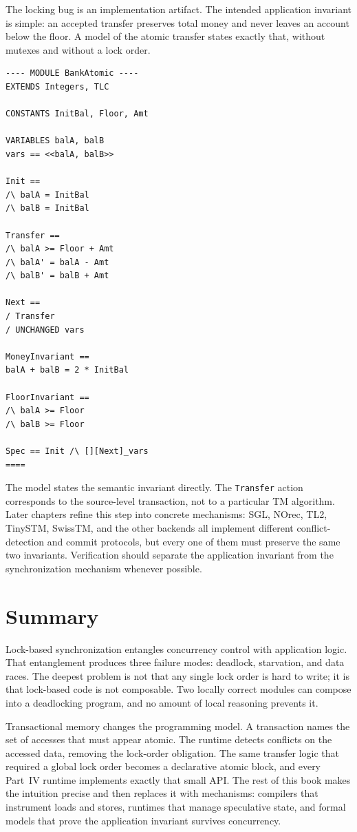 The locking bug is an implementation artifact. The intended application
invariant is simple: an accepted transfer preserves total money and never
leaves an account below the floor. A model of the atomic transfer states
exactly that, without mutexes and without a lock order.

\begin{lstlisting}[caption={A TLA+ model of atomic bank transfers and their invariants.}, label={lst:bank-atomic}]
---- MODULE BankAtomic ----
EXTENDS Integers, TLC

CONSTANTS InitBal, Floor, Amt

VARIABLES balA, balB
vars == <<balA, balB>>

Init ==
/\ balA = InitBal
/\ balB = InitBal

Transfer ==
/\ balA >= Floor + Amt
/\ balA' = balA - Amt
/\ balB' = balB + Amt

Next ==
/ Transfer
/ UNCHANGED vars

MoneyInvariant ==
balA + balB = 2 * InitBal

FloorInvariant ==
/\ balA >= Floor
/\ balB >= Floor

Spec == Init /\ [][Next]_vars
====
\end{lstlisting}

The model states the semantic invariant directly. The \texttt{Transfer} action
corresponds to the source-level transaction, not to a particular TM algorithm.
Later chapters refine this step into concrete mechanisms: SGL, NOrec, TL2,
TinySTM, SwissTM, and the other backends all implement different
conflict-detection and commit protocols, but every one of them must preserve
the same two invariants. Verification should separate the application
invariant from the synchronization mechanism whenever possible.

\section{Summary}
\label{sec:ch1-summary}

Lock-based synchronization entangles concurrency control with application
logic. That entanglement produces three failure modes: deadlock, starvation,
and data races. The deepest problem is not that any single lock order is hard
to write; it is that lock-based code is not composable. Two locally correct
modules can compose into a deadlocking program, and no amount of local
reasoning prevents it.

Transactional memory changes the programming model. A transaction names the
set of accesses that must appear atomic. The runtime detects conflicts on the
accessed data, removing the lock-order obligation. The same transfer logic
that required a global lock order becomes a declarative atomic block, and
every Part~IV runtime implements exactly that small API. The rest of this book
makes the intuition precise and then replaces it with mechanisms: compilers
that instrument loads and stores, runtimes that manage speculative state, and
formal models that prove the application invariant survives concurrency.

